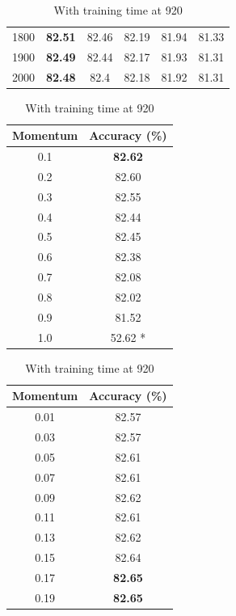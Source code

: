 \documentclass[12pt]{article}
\begin{document}
\begin{table}[H]
\begin{subtable}{.49\linewidth}
\begin{tabular}{c|ccccc}
            1800  & \textbf{82.51} & 82.46 & 82.19 & 81.94 & 81.33 \\
            1900  & \textbf{82.49} & 82.44 & 82.17 & 81.93 & 81.31 \\
            2000  & \textbf{82.48} & 82.4  & 82.18 & 81.92 & 81.31 \\
            \bottomrule
          \end{tabular}
          \label{tab:ann-m-a}
        \end{subtable}
        \begin{subtable}{.49\linewidth}
          \centering
          \caption{With training time at 920}
          \begin{tabular}{c|c}
            \toprule
            \multicolumn{1}{l|}{Momentum} & \multicolumn{1}{l}{Accuracy (\%)} \\
            \midrule
            0.1   & \textbf{82.62} \\
            0.2   & 82.60 \\
            0.3   & 82.55 \\
            0.4   & 82.44 \\
            0.5   & 82.45 \\
            0.6   & 82.38 \\
            0.7   & 82.08 \\
            0.8   & 82.02 \\
            0.9   & 81.52 \\
            1.0   & 52.62 * \\
            \bottomrule
          \end{tabular}
          \label{tab:ann-m-b}
        \end{subtable}
        \begin{subtable}{.49\linewidth}
          \centering
          \caption{With training time at 920}
            \begin{tabular}{c|c}
              \toprule
              \multicolumn{1}{l|}{Momentum} & \multicolumn{1}{l}{Accuracy (\%)} \\
              \midrule
              0.01  & 82.57 \\
              0.03  & 82.57 \\
              0.05  & 82.61 \\
              0.07  & 82.61 \\
              0.09  & 82.62 \\
              0.11  & 82.61 \\
              0.13  & 82.62 \\
              0.15  & 82.64 \\
              0.17  & \textbf{82.65} \\
              0.19  & \textbf{82.65} \\
              \bottomrule
            \end{tabular}%
            \label{tab:ann-m-c}
        \end{subtable}
        \label{tab:ann-m}
      \end{table}
      \onehalfspacing
\end{document}
